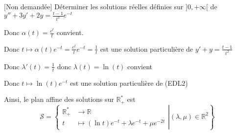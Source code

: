 \documentclass{article}
\begin{document}
\begin{question_kholle}[]{[Non demandée] Déterminer les solutions réelles définies sur $]0, + \infty [$ de $y'' + 3y' +2y = \frac{t-1}{t^{2}}e^{ -t }$}
\begin{itemize}[label=$\star$]
\begin{itemize}[label=$\lozenge$]
\begin{itemize}[label=$\triangle$]
                          Donc $\alpha(t) = \frac{e^{ t }}{t}$ convient.
                  \end{itemize}

                  Donc $t \mapsto \alpha(t)e^{ -t } = \frac{e^{ t }}{t}e^{ -t } = \frac{1}{t}$ est une solution particulière de $y'+y = \frac{t-1}{t^{2}}$
          \end{itemize}
          Donc $\lambda'(t) = \frac{1}{t}$ donc $\lambda(t) = \ln(t)$ convient

          Donc $t \mapsto \ln (t) e^{ -t }$ est une solution particulière de (EDL2)
  \end{itemize}
  Ainsi, le plan affine des solutions sur $\mathbb{R}_{+}^{*}$ est
  $$
    \mathcal{S} = \left\{ \left.\begin{array}{ll} \mathbb{R}_{+}^{*} &\to \mathbb{R} \\ t &\mapsto (\ln t)e^{ -t }+ \lambda e^{ -t }+\mu e^{ -2t } \end{array}\right| (\lambda , \mu) \in \mathbb{R}^{2}\right\}
  $$

\end{question_kholle}
\end{document}
